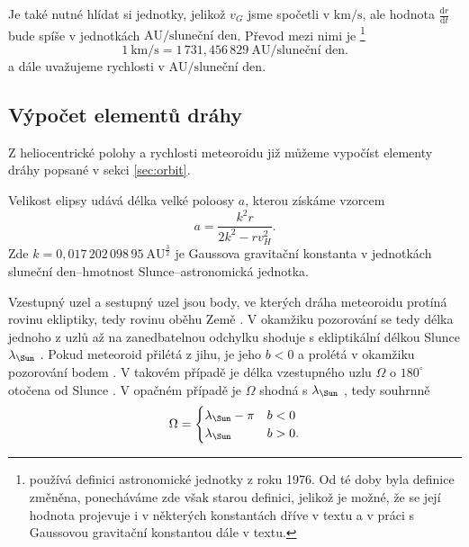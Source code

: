Je také nutné hlídat si jednotky, jelikož $v_G$ jsme spočetli v $\text{km/s}$, ale hodnota $\frac{\text{d}r}{\text{d}t}$ bude spíše v jednotkách $\text{AU/sluneční den}$. Převod mezi nimi je \cite{ceplecha}\footnote{\cite{ceplecha} používá definici astronomické jednotky z roku 1976. Od té doby byla definice změněna, ponecháváme zde však starou definici, jelikož je možné, že se její hodnota projevuje i v některých konstantách dříve v textu a v práci s Gaussovou gravitační konstantou dále v textu.}
$$
    1\:\text{km/s}=1\,731{,}456\,829\:\text{AU/sluneční den.}
$$
a dále uvažujeme rychlosti v $\text{AU/sluneční den}$.

\subsection{Výpočet elementů dráhy}%
Z heliocentrické polohy a rychlosti meteoroidu již můžeme vypočíst elementy dráhy popsané v sekci \ref{sec:orbit}.

\smallskip

Velikost elipsy udává délka velké poloosy $a$, kterou získáme vzorcem \cite{ceplecha}
\begin{equation}
    a=\frac{k^2 r}{2k^2-r v_H^2}\text{.}
\end{equation}
Zde $k=0{,}017\,202\,098\,95\:\text{AU}^\frac{3}{2}$ je Gaussova gravitační konstanta \cite{ceplecha} v jednotkách sluneční den--hmotnost Slunce--astronomická jednotka.

Vzestupný uzel {\NorthNode} a sestupný uzel {\SouthNode} jsou body, ve kterých dráha meteoroidu protíná rovinu ekliptiky, tedy rovinu oběhu Země \cite{astro}. V okamžiku pozorování se tedy délka jednoho z uzlů až na zanedbatelnou odchylku shoduje s ekliptikální délkou Slunce $\lambda_\text{\Sun}$ \cite{ceplecha}. Pokud meteoroid přilétá z jihu, je jeho $b < 0$ a prolétá v okamžiku pozorování bodem {\NorthNode}. V takovém případě je délka vzestupného uzlu $\Omega$ o $180^\circ$ otočena od Slunce \cite{ceplecha}. V opačném případě je $\Omega$ shodná s $\lambda_\text{\Sun}$ \cite{ceplecha}, tedy souhrnně
\begin{equation}
    \Omega=\begin{cases}
        \lambda_\text{\Sun}-\pi & b<0 \\
        \lambda_\text{\Sun}     & b>0 \text{.}
    \end{cases}
\end{equation}

